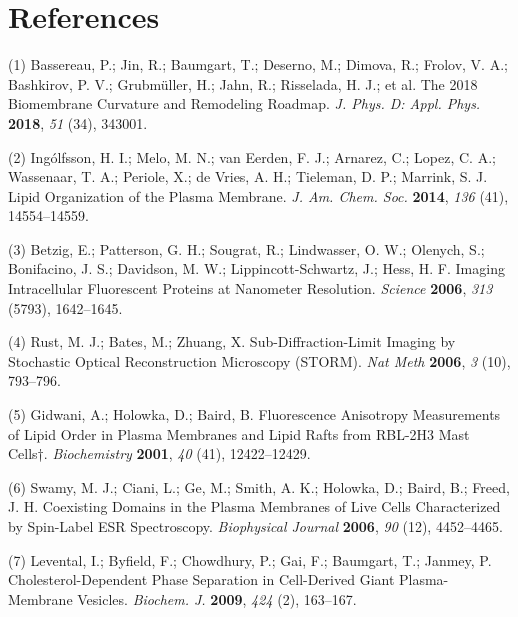 \documentclass[11pt,notitlepage]{article}
\begin{document}
\pagebreak
\setlength{\parskip}{0.1mm}

\hypertarget{references}{%
\section*{References}\label{references}}


\hypertarget{refs}{}
\leavevmode\hypertarget{ref-w5pYOl69}{}%
(1) Bassereau, P.; Jin, R.; Baumgart, T.; Deserno, M.; Dimova, R.;
Frolov, V. A.; Bashkirov, P. V.; Grubmüller, H.; Jahn, R.; Risselada, H.
J.; et al. The 2018 Biomembrane Curvature and Remodeling Roadmap.
\emph{J. Phys. D: Appl. Phys.} \textbf{2018}, \emph{51} (34), 343001.

\leavevmode\hypertarget{ref-1Dvbhukpz}{}%
(2) Ingólfsson, H. I.; Melo, M. N.; van Eerden, F. J.; Arnarez, C.;
Lopez, C. A.; Wassenaar, T. A.; Periole, X.; de Vries, A. H.; Tieleman,
D. P.; Marrink, S. J. Lipid Organization of the Plasma Membrane.
\emph{J. Am. Chem. Soc.} \textbf{2014}, \emph{136} (41), 14554--14559.

\leavevmode\hypertarget{ref-mNNsAL8U}{}%
(3) Betzig, E.; Patterson, G. H.; Sougrat, R.; Lindwasser, O. W.;
Olenych, S.; Bonifacino, J. S.; Davidson, M. W.; Lippincott-Schwartz,
J.; Hess, H. F. Imaging Intracellular Fluorescent Proteins at Nanometer
Resolution. \emph{Science} \textbf{2006}, \emph{313} (5793), 1642--1645.

\leavevmode\hypertarget{ref-12fkuxySq}{}%
(4) Rust, M. J.; Bates, M.; Zhuang, X. Sub-Diffraction-Limit Imaging by
Stochastic Optical Reconstruction Microscopy (STORM). \emph{Nat Meth}
\textbf{2006}, \emph{3} (10), 793--796.

\leavevmode\hypertarget{ref-GGtK2c0N}{}%
(5) Gidwani, A.; Holowka, D.; Baird, B. Fluorescence Anisotropy
Measurements of Lipid Order in Plasma Membranes and Lipid Rafts from
RBL-2H3 Mast Cells†. \emph{Biochemistry} \textbf{2001}, \emph{40} (41),
12422--12429.

\leavevmode\hypertarget{ref-1Eg1Hzju1}{}%
(6) Swamy, M. J.; Ciani, L.; Ge, M.; Smith, A. K.; Holowka, D.; Baird,
B.; Freed, J. H. Coexisting Domains in the Plasma Membranes of Live
Cells Characterized by Spin-Label ESR Spectroscopy. \emph{Biophysical
Journal} \textbf{2006}, \emph{90} (12), 4452--4465.

\leavevmode\hypertarget{ref-oBaB5Z87}{}%
(7) Levental, I.; Byfield, F.; Chowdhury, P.; Gai, F.; Baumgart, T.;
Janmey, P. Cholesterol-Dependent Phase Separation in Cell-Derived Giant
Plasma-Membrane Vesicles. \emph{Biochem. J.} \textbf{2009}, \emph{424}
(2), 163--167.
\end{document}
